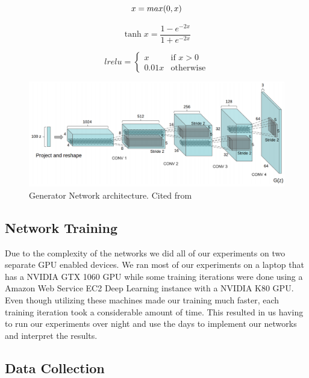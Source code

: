 \begin{equation}
\label{relu-equation}
x = max(0, x)\\
\end{equation}

\begin{equation}
\label{tanh-equation}
\tanh x = \frac{1 - e^{-2x}}{1 + e^{-2x}}
\end{equation}

\begin{equation}
\label{lrelu-equation}
       lrelu = 
        \begin{cases}
            x & \text{if $x > 0$} \\
            0.01x & \text{otherwise}
        \end{cases}
\end{equation}


\begin{figure}[h]
\centering
\includegraphics[width=\textwidth]{figures/DCGAN.png}
\caption{Generator Network architecture. Cited from \cite{DBLP:journals/corr/RadfordMC15} }
\label{fig:architecture}
\end{figure}

\subsection{Network Training}
Due to the complexity of the networks we did all of our experiments on two separate GPU enabled devices. We ran most of our experiments on a laptop that has a NVIDIA GTX 1060 GPU while some training iterations were done using a Amazon Web Service EC2 Deep Learning instance with a NVIDIA K80 GPU. Even though utilizing these machines made our training much faster, each training iteration took a considerable amount of time. This resulted in us having to run our experiments over night and use the days to implement our networks and interpret the results. 

\subsection{Data Collection}

